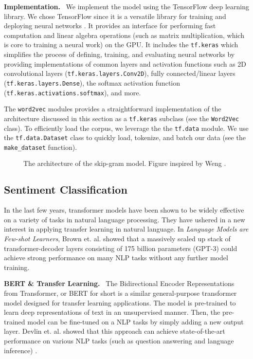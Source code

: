 \documentclass{paper}
\newcommand{\inlineSection}[1]{\vspace{0.5em}\noindent\textbf{#1.}~}
\begin{document}
\inlineSection{Implementation} We implement the model using the TensorFlow deep learning library. We chose TensorFlow since it is a versatile library for training and deploying neural networks \cite{tensorflow2015-whitepaper}. It provides an interface for performing fast computation and linear algebra operations (such as matrix multiplication, which is core to training a neural work) on the GPU. It includes the \texttt{tf.keras} which simplifies the process of defining, training, and evaluating neural networks by providing implementations of common layers and activation functions such as 2D convolutional layers (\texttt{tf.keras.layers.Conv2D}), fully connected/linear layers (\texttt{tf.keras.layers.Dense}), the softmax activation function (\texttt{tf.keras.activations.softmax}), and more. 

The \texttt{word2vec} modules provides a straightforward implementation of the architecture discussed in this section as a \texttt{tf.keras} subclass (see the \texttt{Word2Vec} class). To efficiently load the corpus, we leverage the the \texttt{tf.data} module. We use the \texttt{tf.data.Dataset} class to quickly load, tokenize, and batch our data (see the \texttt{make\_dataset} function). 

\begin{figure}[ht]
    \centering
    
    \caption{The architecture of the skip-gram model. Figure inspired by Weng \cite{weng_learning_embeddings}.}
    \label{fig:skipgram_architecture}
\end{figure}

\subsection{Sentiment Classification}
In the last few years, transformer models have been shown to be widely effective on a variety of tasks in natural language processing. They have ushered in a new interest in applying transfer learning in natural language. In \textit{Language Models are Few-shot Learners}, Brown et. al. showed that a massively scaled up stack of transformer-decoder layers consisting of 175 billion parameters (GPT-3) could achieve strong performance on many NLP tasks without any further model training. 

\inlineSection{BERT \& Transfer Learning} The Bidirectional Encoder Representations from Transformer, or BERT for short is a similar general-purpose transformer model designed for transfer learning applications. The model is pre-trained to learn deep representations of text in an unsupervised manner. Then, the pre-trained model can be fine-tuned on a NLP tasks by simply adding a new output layer. Devlin et. al. showed that this approach can achieve state-of-the-art performance on various NLP tasks (such as question answering and language inference) \cite{devlin2019bert}.
\end{document}
